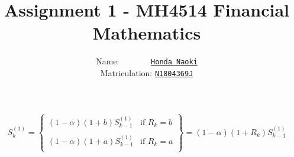 \documentclass[12pt]{article}
\newenvironment{solution}[2][Solution]{\begin{trivlist}
\item[\hskip \labelsep {\bfseries #1}\hskip \labelsep {\bfseries #2.}]}{\end{trivlist}}
\newenvironment{question}[2][Question]{\begin{trivlist}
\item[\hskip \labelsep {\bfseries #1}\hskip \labelsep {\bfseries #2.}]}{\end{trivlist}}
\begin{document}
 
 
 
\title{Assignment 1 - MH4514 Financial Mathematics}
\author{Name: \ \ \ \ \ \ \  \underline{\texttt{Honda Naoki}}\\ 
Matriculation: \underline{\texttt{N1804369J}}} 

\maketitle

\begin{question}{1}
\end{question}

\begin{solution}[Solution] \\ 

\begin{eqnarray*}
S_k^{(1)}= \left\{\begin{array}{lr}
    (1-\alpha)(1+b)S_{k-1}^{(1)} & \text{if\ } R_k = b \\
    \\
    (1-\alpha)(1+a)S_{k-1}^{(1)} & \text{if\ } R_k = a \\
\end{array}\right\} = (1-\alpha)(1+R_k)S_{k-1}^{(1)}
\end{eqnarray*}\\ 

\end{solution}
\end{document}
